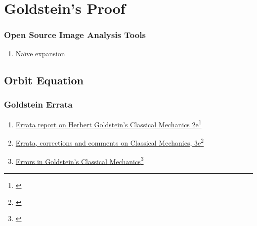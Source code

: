% 

\section{Goldstein's Proof}
\begin{frame}\frametitle{Open Source Image Analysis Tools}
\begin{enumerate}
	\item Naïve expansion
\end{enumerate}
\end{frame}


\subsection{Orbit Equation}

\begin{frame}\frametitle{Goldstein Errata}
\begin{enumerate}
	\item \href{https://www.osti.gov/servlets/purl/6712863}{Errata report on Herbert Goldstein's Classical Mechanics 2e}\footnote{\cite{osti_6712863}}
	\item \href{http://astro.physics.sc.edu/goldstein/}{Errata, corrections and comments on Classical Mechanics, 3e}\footnote{\cite{goldstein3errata}}
	\item \href{https://pubs.aip.org/aapt/ajp/article-abstract/71/2/103/1055926/Errors-in-Goldstein-s-Classical-Mechanics?redirectedFrom=fulltext}{Errors in Goldstein’s Classical Mechanics}\footnote{\cite{tiersten2003errors}}
\end{enumerate}
\end{frame}

\endinput  %

